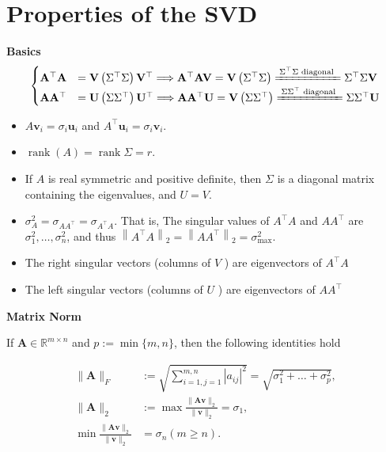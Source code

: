 \documentclass[14pt]{article}
\theoremstyle{definition}
\theoremstyle{remark}
\begin{document}
\section*{Properties of the SVD}
\begin{multicols*}{2}

\textbf{Basics}
$$
    \begin{cases}
        \mathbf{A}^\top\mathbf{A} &=\mathbf{V}\left(\Sigma^\top \Sigma\right) \mathbf{V}^\top \Longrightarrow \mathbf{A}^\top \mathbf{A}\mathbf{V} = \mathbf{V}\left(\Sigma^\top \Sigma\right) \xlongequal{\Sigma^\top \Sigma \text{ diagonal }}\Sigma^\top \Sigma \mathbf{V}\\
        \mathbf{A}\mathbf{A}^\top &=\mathbf{U}\left(\Sigma \Sigma^\top\right) \mathbf{U}^\top \Longrightarrow \mathbf{A} \mathbf{A}^\top\mathbf{U} = \mathbf{V}\left(\Sigma \Sigma^\top\right) \xlongequal{\Sigma \Sigma^\top \text{ diagonal }}\Sigma \Sigma^\top \mathbf{U}
    \end{cases}
$$
\begin{itemize}
    \item $ A \mathbf{v}_{i}=\sigma_{i} \mathbf{u}_{i}$ and $A^{\top} \mathbf{u}_{i}=\sigma_{i} \mathbf{v}_{i}$.
    \item $\operatorname{rank}(A)=\operatorname{rank}\Sigma = r$.
    \item If $A$ is real symmetric and positive definite, then 
    $\Sigma$ is a diagonal matrix containing the eigenvalues, and $U=V$.

    \item $\sigma_A^2 = \sigma_{A A^{\top}} = \sigma_{A^{\top} A}$. That is, The singular values of
          $A^\top A$ and $A A^\top$ are $\sigma_1^2, \ldots, \sigma_n^2$, and thus $\left\|A^\top A\right\|_2 = \left\|A A^\top\right\|_2=\sigma_{\max }^2$.
    \item The right singular vectors (columns of $V$ ) are eigenvectors of $A^{\top} A$
    \item The left singular vectors (columns of $U$ ) are eigenvectors of $A A^{\top}$
\end{itemize}

\textbf{Matrix Norm}

    If $\mathbf{A} \in \mathbb{R}^{m \times n}$ and $p:=\min \{m, n\}$, then the following identities hold

    $$
        \begin{aligned}
            \|\mathbf{A}\|_{F}                                            & :=\sqrt{\sum_{i=1, j=1}^{m, n}\left|a_{i j}\right|^{2}}=\sqrt{\sigma_{1}^{2}+\ldots+\sigma_{p}^{2}}, \\
            \|\mathbf{A}\|_{2}                                            & :=\max \frac{\|\mathbf{A} \mathbf{v}\|_{2}}{\|\mathbf{v}\|_{2}}=\sigma_{1},                          \\
            \min \frac{\|\mathbf{A} \mathbf{v}\|_{2}}{\|\mathbf{v}\|_{2}} & =\sigma_{n}(m \geq n) .
        \end{aligned}
    $$


\end{multicols*}
\end{document}
